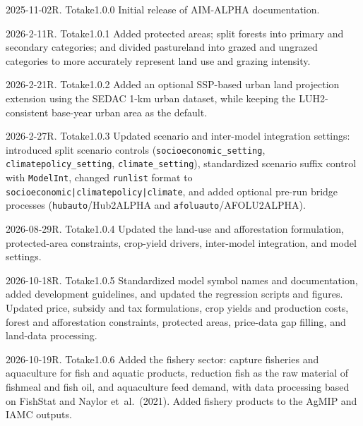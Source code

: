 \begin{changelogentry}{2025-11-02}{R. Totake}{1.0.0}
Initial release of AIM-ALPHA documentation.
\end{changelogentry}
\begin{changelogentry}{2026-2-11}{R. Totake}{1.0.1}
Added protected areas; split forests into primary and secondary categories; and divided pastureland into grazed and ungrazed categories to more accurately represent land use and grazing intensity.
\end{changelogentry}
\begin{changelogentry}{2026-2-21}{R. Totake}{1.0.2}
Added an optional SSP-based urban land projection extension using the SEDAC 1-km urban dataset, while keeping the LUH2-consistent base-year urban area as the default.
\end{changelogentry}
\begin{changelogentry}{2026-2-27}{R. Totake}{1.0.3}
Updated scenario and inter-model integration settings: introduced split scenario controls (\texttt{socioeconomic\_setting}, \texttt{climatepolicy\_setting}, \texttt{climate\_setting}), standardized scenario suffix control with \texttt{ModelInt}, changed \texttt{runlist} format to \texttt{socioeconomic|climatepolicy|climate}, and added optional pre-run bridge processes (\texttt{hubauto}/Hub2ALPHA and \texttt{afoluauto}/AFOLU2ALPHA).
\end{changelogentry}
\begin{changelogentry}{2026-08-29}{R. Totake}{1.0.4}
Updated the land-use and afforestation formulation, protected-area constraints, crop-yield drivers, inter-model integration, and model settings.
\end{changelogentry}
\begin{changelogentry}{2026-10-18}{R. Totake}{1.0.5}
Standardized model symbol names and documentation, added development guidelines, and updated the regression scripts and figures.
Updated price, subsidy and tax formulations, crop yields and production costs, forest and afforestation constraints, protected areas, price-data gap filling, and land-data processing.
\end{changelogentry}
\begin{changelogentry}{2026-10-19}{R. Totake}{1.0.6}
Added the fishery sector: capture fisheries and aquaculture for fish and aquatic products, reduction fish as the raw material of fishmeal and fish oil, and aquaculture feed demand, with data processing based on FishStat and Naylor et~al.~(2021). Added fishery products to the AgMIP and IAMC outputs.
\end{changelogentry}

